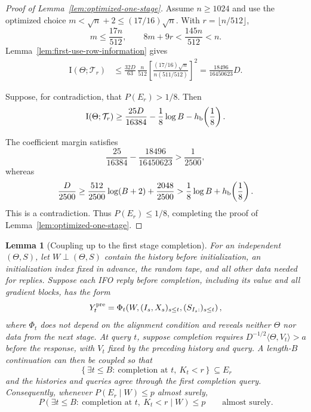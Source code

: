 \documentclass{article}
\newtheorem{lemma}[theorem]{Lemma}
\theoremstyle{definition}
\begin{document}
\begin{proof}[Proof of Lemma~\ref{lem:optimized-one-stage}]
Assume $n\ge1024$ and use the optimized choice
$m<\sqrt n+2\le(17/16)\sqrt n$.  With
$r=\lfloor n/512\rfloor$,
\[
 m\le\frac{17n}{512},
 \qquad
 8m+9r<\frac{145n}{512}<n.
\]
Lemma~\ref{lem:first-use-row-information} gives
\begin{align}
 \mathrm I(\Theta;\mathcal T_r)
 &\le
 \frac{32D}{63}\,
 \frac n{512}
 \left[
 \frac{(17/16)\sqrt n}{n(511/512)}
 \right]^2
 =
 \frac{18496}{16450623}D.
 \label{eq:optimized-mutual-information-upper}
\end{align}

Suppose, for contradiction, that $P(E_r)>1/8$.  Then
\begin{equation*}
 \mathrm I(\Theta;\mathcal T_r)
 \ge \frac{25D}{16384}-\frac18\log B
      -h_{\rm b}\!\left(\frac18\right).
\end{equation*}

The coefficient margin satisfies
\[
 \frac{25}{16384}
 -\frac{18496}{16450623}
 >\frac1{2500},
\]
whereas
\[
 \frac D{2500}
 \ge\frac{512}{2500}\log(B+2)+\frac{2048}{2500}
 >
 \frac18\log B+h_{\rm b}\!\left(\frac18\right).
\]
This is a contradiction.  Thus $P(E_r)\le1/8$, completing the proof of
Lemma~\ref{lem:optimized-one-stage}.
\end{proof}

\begin{lemma}[Coupling up to the first stage completion]
\label{lem:precompletion-extension}
For an independent $(\Theta,S)$, let $W\perp(\Theta,S)$ contain the history before
initialization, an initialization index fixed in advance, the random tape, and
all other data needed for replies.  Suppose each IFO reply before completion,
including its value and all gradient blocks, has the form
\begin{equation}
 Y_t^{\rm pre}=\Phi_t\!\left(
 W,(I_s,X_s)_{s\le t},(S_{I_s:})_{s\le t}
 \right),
 \label{eq:precompletion-reply-form}
\end{equation}
where $\Phi_t$ does not depend on the alignment condition and reveals neither
$\Theta$ nor data from the next stage.  At query $t$, suppose completion requires
$D^{-1/2}\langle\Theta,V_t\rangle>a$ before the response, with $V_t$ fixed by
the preceding history and query.  A length-$B$ continuation can then be coupled so
that
\begin{equation}
 \left\{
 \exists t\le B:\ \text{completion at $t$},\ K_t<r
 \right\}
 \subseteq E_r
 \label{eq:first-alignment-containment}
\end{equation}
and the histories and queries agree through the first completion query.
Consequently, whenever $P(E_r\mid W)\le p$ almost surely,
\begin{equation}
 P\!\left(\exists t\le B:\ \text{completion at $t$},\ K_t<r\mid W\right)
 \le p
 \qquad\text{almost surely}.
 \label{eq:precompletion-probability-bound}
\end{equation}
\end{lemma}
\end{document}
